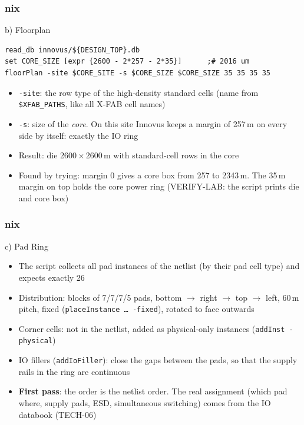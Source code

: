 \documentclass{beamer}
\newcommand{\astitle}{nix}
\newcommand{\assubtitle}{nix}
\newcommand{\cmd}[1]{\texttt{#1}}
\begin{document}
\renewcommand{\assubtitle}{b) Floorplan}
\begin{frame}[fragile]
\frametitle{\astitle}
\begin{block}{\assubtitle}
  \footnotesize
\begin{lstlisting}[style=sh]
read_db innovus/${DESIGN_TOP}.db
set CORE_SIZE [expr {2600 - 2*257 - 2*35}]      ;# 2016 um
floorPlan -site $CORE_SITE -s $CORE_SIZE $CORE_SIZE 35 35 35 35
\end{lstlisting}
  \begin{itemize}
    \item \cmd{-site}: the row type of the high-density standard cells
      (name from \cmd{\$XFAB\_PATHS}, like all X-FAB cell names)
    \item \cmd{-s}: size of the \emph{core}. On this site Innovus keeps a
      margin of 257\,\textmu m on every side by itself: exactly the IO ring
    \item Result: die 2600\,$\times$\,2600\,\textmu m with standard-cell rows
      in the core
    \item Found by trying: margin 0 gives a core box from 257 to 2343\,\textmu m.
      The 35\,\textmu m margin on top holds the core power ring
      (VERIFY-LAB: the script prints die and core box)
  \end{itemize}
\end{block}
\end{frame}

\renewcommand{\assubtitle}{c) Pad Ring}
\begin{frame}
\frametitle{\astitle}
\begin{block}{\assubtitle}
  \footnotesize
  \begin{itemize}
    \item The script collects all pad instances of the netlist
      (by their pad cell type) and expects exactly 26
    \item Distribution: blocks of 7/7/7/5 pads, bottom $\rightarrow$ right
      $\rightarrow$ top $\rightarrow$ left, 60\,\textmu m pitch,
      fixed (\cmd{placeInstance \dots\ -fixed}), rotated to face outwards
    \item Corner cells: not in the netlist, added as physical-only
      instances (\cmd{addInst -physical})
    \item IO fillers (\cmd{addIoFiller}): close the gaps between the pads,
      so that the supply rails in the ring are continuous
    \item \textbf{First pass}: the order is the netlist order. The real
      assignment (which pad where, supply pads, ESD, simultaneous switching)
      comes from the IO databook (TECH-06)
  \end{itemize}
\end{block}
\end{frame}
\end{document}
